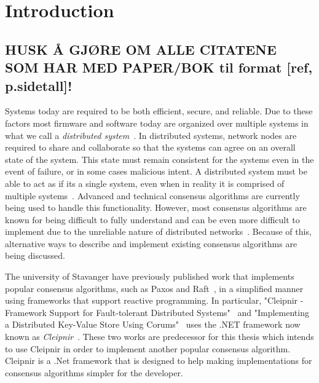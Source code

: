 \chapter{Introduction}
\section*{HUSK Å GJØRE OM ALLE CITATENE SOM HAR MED PAPER/BOK til format [ref, p.sidetall]!}
Systems today are required to be both efficient, secure, and reliable. Due to these factors most firmware and software today are organized over multiple systems in what we call a \textit{distributed system}~\cites{WEB:DistSys}[p.~16]{BOOK:MVstandver3}. In distributed systems, network nodes are required to share and collaborate so that the systems can agree on an overall state of the system. This state must remain consistent for the systems even in the event of failure, or in some cases malicious intent. A distributed system must be able to act as if its a single system, even when in reality it is comprised of multiple systems~\cite[p.~18]{BOOK:MVstandver3}. Advanced and technical consensus algorithms are currently being used to handle this functionality. 
However, most consensus algorithms are known for being difficult to fully understand and can be even more difficult to implement due to the unreliable nature of distributed networks~\cites[p.~459]{BOOK:MVstandver3}[p.~13]{PAPER:EivindPaper}. Because of this, alternative ways to describe and implement existing consensus algorithms are being discussed.



The university of Stavanger have previously published work that implements popular consensus algorithms, such as Paxos and Raft~\cite{WEB:ConsesAlgo}, in a simplified manner using frameworks that support reactive programming. In particular, "Cleipnir - Framework Support for Fault-tolerant Distributed Systems"~\cite{PAPER:PaxosCleipnir} and "Implementing a Distributed Key-Value Store Using Corums"~\cite{PAPER:EivindPaper} uses the .NET framework now known as \textit{Cleipnir}~\cite{DOC:Cleipnir}. 
These two works are predecessor for this thesis which intends to use Cleipnir in order to implement another popular consensus algorithm.
Cleipnir is a .Net framework that is designed to help making implementations for consensus algorithms simpler for the developer.

